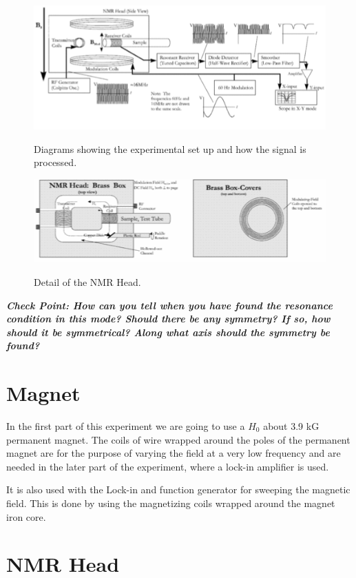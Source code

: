 \documentclass{../lab}
\begin{document}
\begin{figure}[h]
    \centering
    \href{http://experimentationlab.berkeley.edu/sites/default/files/Blockdiagram.gif}{\includegraphics[width=0.5\linewidth]{images/BlockDiagram.png}}
    \caption{Diagrams showing the experimental set up and how the signal is processed.}
    \label{fig:500px-NMR10}
\end{figure}

\begin{figure}[h]
    \centering
    \href{http://experimentationlab.berkeley.edu/sites/default/files/NMRHead.png}{\includegraphics[width=0.5\linewidth]{images/NMRHead.png}}
    \caption{Detail of the NMR Head.}
    \label{fig:DetailOfNMRHead}
\end{figure}

\emph{\textbf{Check Point: How can you tell when you have found the resonance condition in this mode? Should there be any symmetry? If so, how should it be symmetrical? Along what axis should the symmetry be found?}}

\newpage

\section{Magnet}

In the first part of this experiment we are going to use a $H_0$ about 3.9 kG permanent magnet. The coils of wire wrapped around the poles of the permanent magnet are for the purpose of varying the field at a very low frequency and are needed in the later part of the experiment, where a lock-in amplifier is used.

It is also used with the Lock-in and function generator for sweeping the magnetic field. This is done by using the magnetizing coils wrapped around the magnet iron core.

\section{NMR Head}
\end{document}

